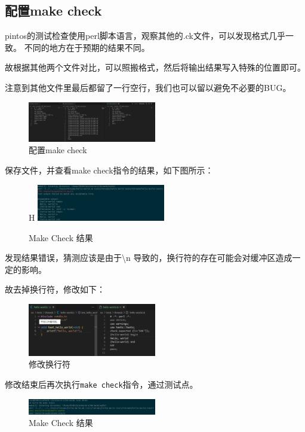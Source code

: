 \subsection{配置make check}

pintos的测试检查使用perl脚本语言，观察其他的.ck文件，可以发现格式几乎一致。
不同的地方在于预期的结果不同。

故根据其他两个文件对比，可以照搬格式，然后将输出结果写入特殊的位置即可。

注意到其他文件里最后都留了一行空行，我们也可以留以避免不必要的BUG。

\begin{figure}[H]
  \centering
  \includegraphics[width=0.5\textwidth]{img2/final.png}
  \caption{配置make check}
\end{figure}

保存文件，并查看make check指令的结果，如下图所示：

\begin{figure}{H}
  \centering
  \includegraphics[width=0.5\textwidth]{img2/fault.png}
  \caption{Make Check 结果}
\end{figure}

发现结果错误，猜测应该是由于\textbackslash n 导致的，换行符的存在可能会对缓冲区造成一定的影响。

故去掉换行符，修改如下：

\begin{figure} [H]
  \centering
  \includegraphics[width=0.5\textwidth]{img2/change.png}
  \caption{修改换行符}
\end{figure}

修改结束后再次执行\texttt{make check}指令，通过测试点。

\begin{figure}[H]
  \centering
  \includegraphics[width=0.5\textwidth]{img2/success2.png}
  \caption{Make Check 结果}
\end{figure}

